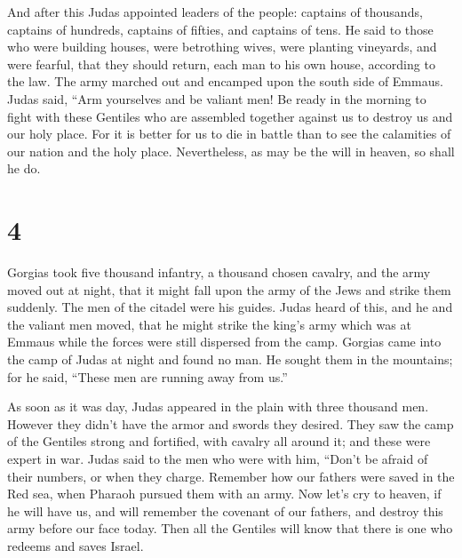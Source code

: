  And after this Judas appointed leaders of the people:
captains of thousands, captains of hundreds, captains of fifties, and
captains of tens.  He said to those who were building
houses, were betrothing wives, were planting vineyards, and were
fearful, that they should return, each man to his own house, according
to the law.  The army marched out and encamped upon the
south side of Emmaus.  Judas said, ``Arm yourselves and be
valiant men! Be ready in the morning to fight with these Gentiles who
are assembled together against us to destroy us and our holy place.
 For it is better for us to die in battle than to see the
calamities of our nation and the holy place.  Nevertheless,
as may be the will in heaven, so shall he do.

\hypertarget{section-3}{%
\section{4}\label{section-3}}

 Gorgias took five thousand infantry, a thousand chosen
cavalry, and the army moved out at night,  that it might
fall upon the army of the Jews and strike them suddenly. The men of the
citadel were his guides.  Judas heard of this, and he and
the valiant men moved, that he might strike the king's army which was at
Emmaus  while the forces were still dispersed from the camp.
 Gorgias came into the camp of Judas at night and found no
man. He sought them in the mountains; for he said, ``These men are
running away from us.''

 As soon as it was day, Judas appeared in the plain with
three thousand men. However they didn't have the armor and swords they
desired.  They saw the camp of the Gentiles strong and
fortified, with cavalry all around it; and these were expert in war.
 Judas said to the men who were with him, ``Don't be afraid
of their numbers, or when they charge.  Remember how our
fathers were saved in the Red sea, when Pharaoh pursued them with an
army.  Now let's cry to heaven, if he will have us, and
will remember the covenant of our fathers, and destroy this army before
our face today.  Then all the Gentiles will know that there
is one who redeems and saves Israel.

